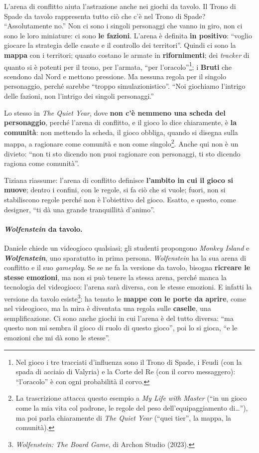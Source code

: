 L'arena di conflitto aiuta l'astrazione anche nei giochi da tavolo. Il Trono di Spade da tavolo
rappresenta tutto ciò che c'è nel Trono di Spade? ``Assolutamente no.'' Non ci sono i singoli
personaggi che vanno in giro, non ci sono le loro miniature: ci sono \textbf{le fazioni}. L'arena è
definita \textbf{in positivo}: ``voglio giocare la strategia delle casate e il controllo dei
territori''. Quindi ci sono la \textbf{mappa} con i territori; quanto costano le armate in
\textbf{rifornimenti}; dei \emph{tracker} di quanto si è potenti per il trono, per l'armata, ``per
l'oracolo''\footnote{Nel gioco i tre tracciati d'influenza sono il Trono di Spade, i Feudi (con la
spada di acciaio di Valyria) e la Corte del Re (con il corvo messaggero): ``l'oracolo'' è con ogni
probabilità il corvo.}; i \textbf{Bruti} che scendono dal Nord e mettono pressione. Ma nessuna
regola per il singolo personaggio, perché sarebbe ``troppo simulazionistico''. ``Noi giochiamo
l'intrigo delle fazioni, non l'intrigo dei singoli personaggi.''

Lo stesso in \emph{The Quiet Year}, dove \textbf{non c'è nemmeno una scheda del personaggio},
perché l'arena di conflitto, e il gioco lo dice chiaramente, è \textbf{la comunità}: non mettendo
la scheda, il gioco obbliga, quando si disegna sulla mappa, a ragionare come comunità e non come
singolo\footnote{La trascrizione attacca questo esempio a \emph{My Life with Master} (``in un gioco
come la mia vita col padrone, le regole del peso dell'equipaggiamento di\ldots''), ma poi parla
chiaramente di \emph{The Quiet Year} (``quei tier'', la mappa, la comunità).}. Anche qui non è un
divieto: ``non ti sto dicendo non puoi ragionare con personaggi, ti sto dicendo ragiona come
comunità''.

Tiziana riassume: l'arena di conflitto definisce \textbf{l'ambito in cui il gioco si muove}; dentro
i confini, con le regole, si fa ciò che si vuole; fuori, non si stabiliscono regole perché non è
l'obiettivo del gioco. Esatto, e questo, come designer, ``ti dà una grande tranquillità d'animo''.

\paragraph{\emph{Wolfenstein} da tavolo.} Daniele chiede un videogioco qualsiasi; gli studenti
propongono \emph{Monkey Island} e \textbf{\emph{Wolfenstein}}, uno sparatutto in prima persona.
\emph{Wolfenstein} ha la sua arena di conflitto e il suo \emph{gameplay}. Se se ne fa la versione
da tavolo, bisogna \textbf{ricreare le stesse emozioni}, ma non si può tenere la stessa arena,
perché manca la tecnologia del videogioco: l'arena sarà diversa, con le stesse emozioni. E infatti
la versione da tavolo esiste\footnote{\emph{Wolfenstein: The Board Game}, di Archon Studio (2023).}:
ha tenuto le \textbf{mappe con le porte da aprire}, come nel videogioco, ma la mira è diventata una
regola sulle \textbf{caselle}, una semplificazione. Ci sono anche giochi in cui l'arena è del tutto
diversa: ``ma questo non mi sembra il gioco di ruolo di questo gioco'', poi lo si gioca, ``e le
emozioni che mi dà sono le stesse''.

